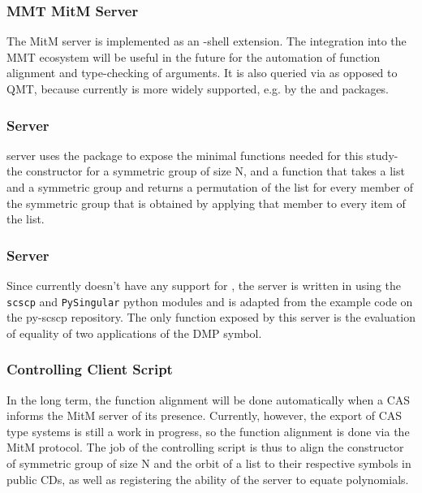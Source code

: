 \subsubsection{MMT MitM Server}

The MitM server is implemented as an \MMT-shell extension. The integration into the
MMT ecosystem will be useful in the future for the automation of function 
alignment and type-checking of arguments. It is also queried via \SCSCP as opposed 
to QMT, because currently \SCSCP is more widely supported, e.g. by the \GAP and 
\Python packages.

\subsubsection{\GAP \SCSCP Server}

\GAP server uses the \GAP \SCSCP package to expose the minimal functions needed for 
this study- the constructor for a symmetric group of size N, and a function that
takes a list and a symmetric group and returns a permutation of the list for every 
member of the symmetric group that is obtained by applying that member to every
item of the list.

\subsubsection{\Singular \SCSCP Server}

Since \Singular currently doesn't have any support for \SCSCP, the \Singular \SCSCP server is
written in \Python using the \lstinline|scscp| and \lstinline|PySingular| python modules
and is adapted from the example code on the py-scscp repository\cite{PySCSCP}. The only
function exposed by this server is the evaluation of equality of two applications of the
DMP symbol.

\subsubsection{Controlling Client Script}

In the long term, the function alignment will be done automatically when a CAS 
informs the MitM server of its presence. Currently, however, the export of CAS 
type systems is still a work in progress, so the function alignment is done
via the MitM protocol. The job of the controlling script is thus to align the 
constructor of symmetric group of size N and the orbit of a list to their 
respective symbols in public CDs, as well as registering the ability of the 
\Singular server to equate polynomials.

